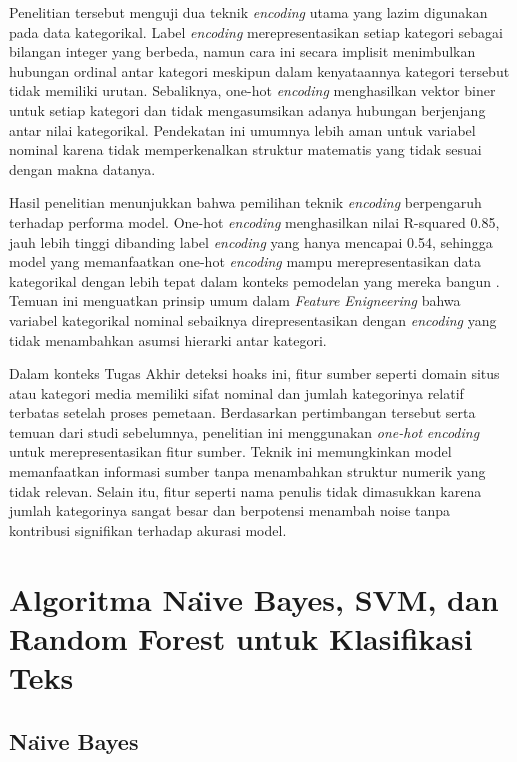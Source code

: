 Penelitian \textcite{herdian2024studi} tersebut menguji dua teknik \textit{encoding} utama yang lazim digunakan pada data kategorikal. Label \textit{encoding} merepresentasikan setiap kategori sebagai bilangan integer yang berbeda, namun cara ini secara implisit menimbulkan hubungan ordinal antar kategori meskipun dalam kenyataannya kategori tersebut tidak memiliki urutan. Sebaliknya, one-hot \textit{encoding} menghasilkan vektor biner untuk setiap kategori dan tidak mengasumsikan adanya hubungan berjenjang antar nilai kategorikal. Pendekatan ini umumnya lebih aman untuk variabel nominal karena tidak memperkenalkan struktur matematis yang tidak sesuai dengan makna datanya.

Hasil penelitian \textcite{herdian2024studi} menunjukkan bahwa pemilihan teknik \textit{encoding} berpengaruh terhadap performa model. One-hot \textit{encoding} menghasilkan nilai R-squared 0.85, jauh lebih tinggi dibanding label \textit{encoding} yang hanya mencapai 0.54, sehingga model yang memanfaatkan one-hot \textit{encoding} mampu merepresentasikan data kategorikal dengan lebih tepat dalam konteks pemodelan yang mereka bangun . Temuan ini menguatkan prinsip umum dalam \textit{Feature Enigneering} bahwa variabel kategorikal nominal sebaiknya direpresentasikan dengan \textit{encoding} yang tidak menambahkan asumsi hierarki antar kategori.

Dalam konteks Tugas Akhir deteksi hoaks ini, fitur sumber seperti domain situs atau kategori media memiliki sifat nominal dan jumlah kategorinya relatif terbatas setelah proses pemetaan. Berdasarkan pertimbangan tersebut serta temuan dari studi sebelumnya, penelitian ini menggunakan \textit{one-hot} \textit{encoding} untuk merepresentasikan fitur sumber. Teknik ini memungkinkan model memanfaatkan informasi sumber tanpa menambahkan struktur numerik yang tidak relevan. Selain itu, fitur seperti nama penulis tidak dimasukkan karena jumlah kategorinya sangat besar dan berpotensi menambah noise tanpa kontribusi signifikan terhadap akurasi model.

\section{Algoritma Na\"{\i}ve Bayes, SVM, dan Random Forest untuk Klasifikasi Teks}

\subsection{Na\"{\i}ve Bayes}

